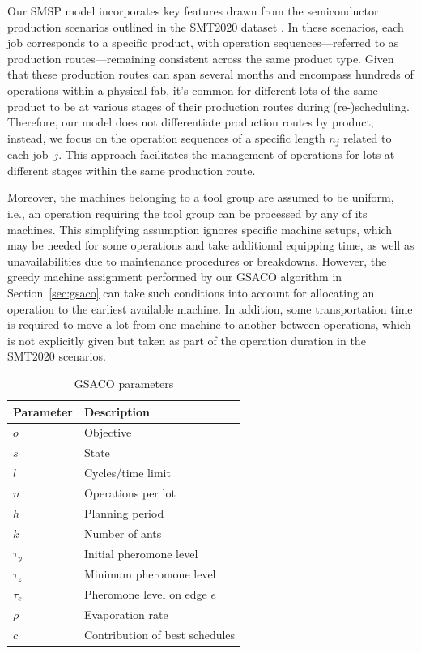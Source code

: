 \documentclass[runningheads]{llncs}
\begin{document}
Our SMSP model incorporates key features drawn from the semiconductor production 
scenarios outlined in the SMT2020 dataset \cite{kopp2020smt2020}. 
In these scenarios, each job corresponds to a specific product, 
with operation sequences—referred to as production routes—remaining 
consistent across the same product type. Given that these production routes 
can span several months and encompass hundreds of operations within a physical fab, 
it's common for different lots of the same product to be at various stages 
of their production routes during (re-)scheduling. 
Therefore, our model does not differentiate production routes by product; 
instead, we focus on the operation sequences of a specific length $n_j$ related to each job~$j$. 
This approach facilitates the management of operations for lots at different stages within the same production route.

Moreover, the machines belonging to a tool group are assumed to be uniform,
i.e., an operation requiring the tool group can be processed by any of its
machines.
This simplifying assumption ignores specific machine setups, which may be
needed for some operations and take additional equipping time,
as well as unavailabilities due to maintenance procedures or breakdowns.
However, the greedy machine assignment performed by our GSACO algorithm
in Section~\ref{sec:gsaco} can take such conditions into account for
allocating an operation to the earliest available machine.
In addition, some transportation time is required to move
a lot from one machine to another between operations,
which is not explicitly given but taken as part of the operation duration
in the SMT2020 scenarios.

\begin{table}[t]
	\caption{GSACO parameters}\label{tab:parameters} \centering
	\begin{tabular}{|l|l|}
		\hline
		Parameter & Description \\ \hline
		$o$ & Objective \\
		$s$ & State \\
		$l$ & Cycles/time limit        \\
		$n$ & Operations per lot \\
		$h$ & Planning period \\
		$k$ & Number of ants \\
		$\tau_{y}$ & Initial pheromone level \\
		$\tau_{z}$ & Minimum pheromone level \\
		$\tau_{e}$ & Pheromone level on edge $e$ \\
		$\rho$ & Evaporation rate \\
		$c$ & Contribution of best schedules \\
		\hline
	\end{tabular}
\end{table}
\end{document}
